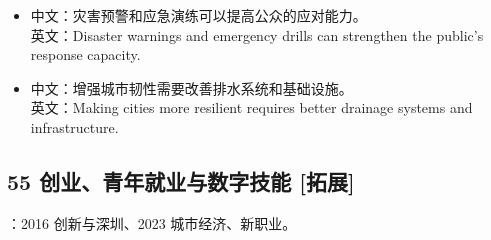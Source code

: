 \documentclass[a4paper,11pt,UTF8,fontset=none]{ctexart}
\begin{document}
\par

\begin{itemize}[leftmargin=1.7em,itemsep=1pt,parsep=0pt,topsep=2pt]
\item \noindent 中文：灾害预警和应急演练可以提高公众的应对能力。\\ 英文：Disaster warnings and emergency drills can strengthen the public’s response capacity.\par


\item \noindent 中文：增强城市韧性需要改善排水系统和基础设施。\\ 英文：Making cities more resilient requires better drainage systems and infrastructure.\par


\end{itemize}

\subsection{55 创业、青年就业与数字技能 {\color{AccentBlue} [拓展]}}

\begin{tcolorbox}[enhanced,breakable,boxrule=0.35pt,colback=VeryPaleBlue,colframe=AccentBlue!40,left=7pt,right=7pt,top=4pt,bottom=4pt,borderline west={2pt}{0pt}{AccentBlue},before skip=4pt,after skip=6pt]
：2016 创新与深圳、2023 城市经济、新职业。\par


\end{tcolorbox}
\end{document}
